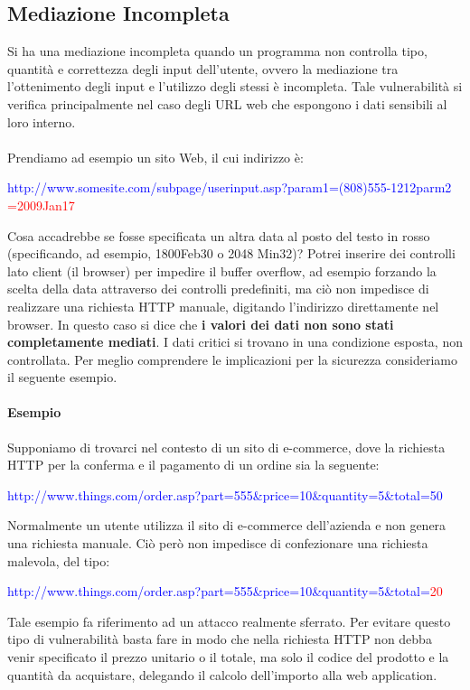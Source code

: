 \subsection{Mediazione Incompleta}
Si ha una mediazione incompleta quando un programma non controlla tipo, quantità e correttezza degli input dell'utente, ovvero la mediazione tra l'ottenimento degli input e l'utilizzo degli stessi è incompleta. Tale vulnerabilità si verifica principalmente nel caso degli URL web che espongono i dati sensibili al loro interno. \\ \\
Prendiamo ad esempio un sito Web, il cui indirizzo è:
\begin{center}
\textcolor{blue}{http://www.somesite.com/subpage/userinput.asp?param1=(808)555-1212parm2} \textcolor{red}{=2009Jan17}
\end{center}
Cosa accadrebbe se fosse specificata un altra data al posto del testo in rosso (specificando, ad esempio, 1800Feb30 o  2048 Min32)? Potrei inserire dei controlli lato client (il browser) per impedire il buffer overflow, ad esempio forzando la scelta della data attraverso dei controlli predefiniti, ma ciò non impedisce di realizzare una richiesta HTTP manuale, digitando l'indirizzo direttamente nel browser. In questo caso si dice che \textbf{i valori dei dati non sono stati completamente mediati}. I dati critici si trovano in una condizione esposta, non controllata. Per meglio comprendere le implicazioni per la sicurezza consideriamo il seguente esempio.

\paragraph{Esempio} 
Supponiamo di trovarci nel contesto di un sito di e-commerce, dove la richiesta HTTP per la conferma e il pagamento di un ordine sia la seguente:
\begin{center}
\textcolor{blue}{http://www.things.com/order.asp?part=555\&price=10\&quantity=5\&total=50}
\end{center}
Normalmente un utente utilizza il sito di e-commerce dell'azienda e non genera una richiesta manuale. Ciò però non impedisce di confezionare una richiesta malevola, del tipo:
\begin{center}
\textcolor{blue}{http://www.things.com/order.asp?part=555\&price=10\&quantity=5\&total=}\textcolor{red}{20}
\end{center}
Tale esempio fa riferimento ad un attacco realmente sferrato. Per evitare questo tipo di vulnerabilità basta fare in modo che nella richiesta HTTP non debba venir specificato il prezzo unitario o il totale, ma solo il codice del prodotto e la quantità da acquistare, delegando il calcolo dell'importo alla web application.

